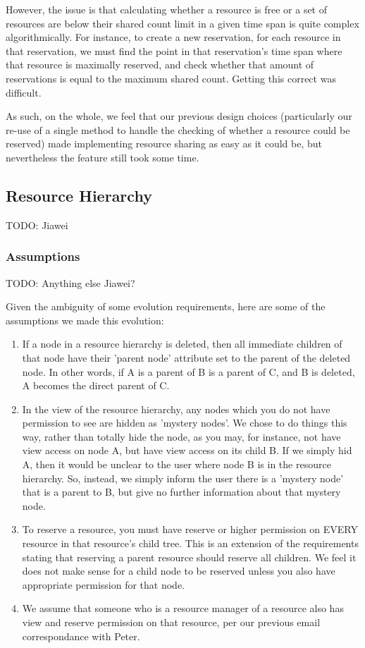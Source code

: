 \documentclass[12pt]{article}
\begin{document}
However, the issue is that calculating whether a resource is free or a set of resources are below their shared count limit in a given time span is quite complex algorithmically. For instance, to create a new reservation, for each resource in that reservation, we must find the point in that reservation's time span where that resource is maximally reserved, and check whether that amount of reservations is equal to the maximum shared count. Getting this correct was difficult. 

As such, on the whole, we feel that our previous design choices (particularly our re-use of a single method to handle the checking of whether a resource could be reserved) made implementing resource sharing as easy as it could be, but nevertheless the feature still took some time. 

\subsection{Resource Hierarchy}
TODO: Jiawei


\subsubsection{Assumptions}
TODO: Anything else Jiawei? 

Given the ambiguity of some evolution requirements, here are some of the assumptions we made this evolution:
\begin{enumerate}
    \item If a node in a resource hierarchy is deleted, then all immediate children of that node have their 'parent node' attribute set to the parent of the deleted node. In other words, if A is a parent of B is a parent of C, and B is deleted, A becomes the direct parent of C. 
    \item In the view of the resource hierarchy, any nodes which you do not have permission to see are hidden as 'mystery nodes'. We chose to do things this way, rather than totally hide the node, as you may, for instance, not have view access on node A, but have view access on its child B. If we simply hid A, then it would be unclear to the user where node B is in the resource hierarchy. So, instead, we simply inform the user there is a 'mystery node' that is a parent to B, but give no further information about that mystery node. 
    \item To reserve a resource, you must have reserve or higher permission on EVERY resource in that resource's child tree. This is an extension of the requirements stating that reserving a parent resource should reserve all children. We feel it does not make sense for a child node to be reserved unless you also have appropriate permission for that node. 
    \item We assume that someone who is a resource manager of a resource also has view and reserve permission on that resource, per our previous email correspondance with Peter. 
\end{enumerate}
\end{document}
